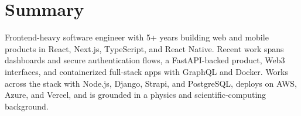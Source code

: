 \section{Summary}

Frontend-heavy software engineer with 5+ years building web and mobile products in React, Next.js, TypeScript, and React Native. Recent work spans dashboards and secure authentication flows, a FastAPI-backed product, Web3 interfaces, and containerized full-stack apps with GraphQL and Docker. Works across the stack with Node.js, Django, Strapi, and PostgreSQL, deploys on AWS, Azure, and Vercel, and is grounded in a physics and scientific-computing background.
